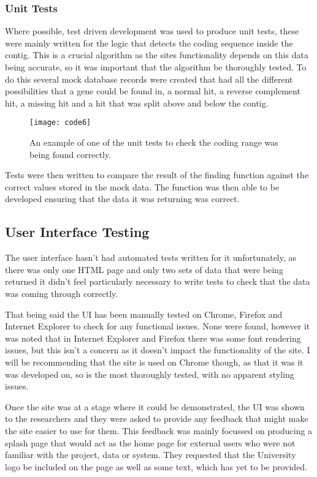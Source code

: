 \subsubsection{Unit Tests}
Where possible, test driven development was used to produce unit tests, these were mainly written for the logic that detects the coding sequence inside the contig. This is a crucial algorithm as the sites functionality depends on this data being accurate, so it was important that the algorithm be thoroughly tested. To do this several mock database records were created that had all the different possibilities that a gene could be found in, a normal hit, a reverse complement hit, a missing hit and a hit that was split above and below the contig. 

\begin{figure}[H]
\begin{center}
\texttt{[image: code6]}
\caption{An example of one of the unit tests to check the coding range was being found correctly.}
\end{center}
\end{figure}

Tests were then written to compare the result of the finding function against the correct values stored in the mock data. The function was then able to be developed ensuring that the data it was returning was correct. 

\subsection{User Interface Testing}
The user interface hasn't had automated tests written for it unfortunately, as there was only one HTML page and only two sets of data that were being returned it didn't feel particularly necessary to write tests to check that the data was coming through correctly. 

That being said the UI has been manually tested on Chrome, Firefox and Internet Explorer to check for any functional issues. None were found, however it was noted that in Internet Explorer and Firefox there was some font rendering issues, but this isn't a concern as it doesn't impact the functionality of the site. I will be recommending that the site is used on Chrome though, as that it was it was developed on, so is the most thoroughly tested, with no apparent styling issues. 

Once the site was at a stage where it could be demonstrated, the UI was shown to the researchers and they were asked to provide any feedback that might make the site easier to use for them. This feedback was mainly focussed on producing a splash page that would act as the home page for external users who were not familiar with the project, data or system. They requested that the University logo be included on the page as well as some text, which has yet to be provided.

